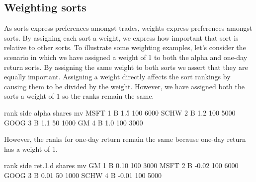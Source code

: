 \documentclass{article}
\begin{document}


\subsection{Weighting sorts}
\label{words weighting sorts}

As sorts express preferences amongst trades, weights express
preferences amongst sorts.  By assigning each sort a weight, we
express how important that sort is relative to other sorts.  To
illustrate some weighting examples, let's consider the scenario in
which we have assigned a weight of 1 to both the alpha and one-day
return sorts.  By assigning the same weight to both sorts we assert
that they are equally important.  Assigning a weight directly affects
the sort rankings by causing them to be divided by the weight.
However, we have assigned both the sorts a weight of 1 so the ranks
remain the same.

\begin{Schunk}
\begin{Soutput}
     rank side alpha shares   mv
MSFT    1    B   1.5    100 6000
SCHW    2    B   1.2    100 5000
GOOG    3    B   1.1     50 1000
GM      4    B   1.0    100 3000
\end{Soutput}
\end{Schunk}

However, the ranks for one-day return remain the same because one-day
return has a weight of 1.

\begin{Schunk}
\begin{Soutput}
     rank side ret.1.d shares   mv
GM      1    B    0.10    100 3000
MSFT    2    B   -0.02    100 6000
GOOG    3    B    0.01     50 1000
SCHW    4    B   -0.01    100 5000
\end{Soutput}
\end{Schunk}
\end{document}
